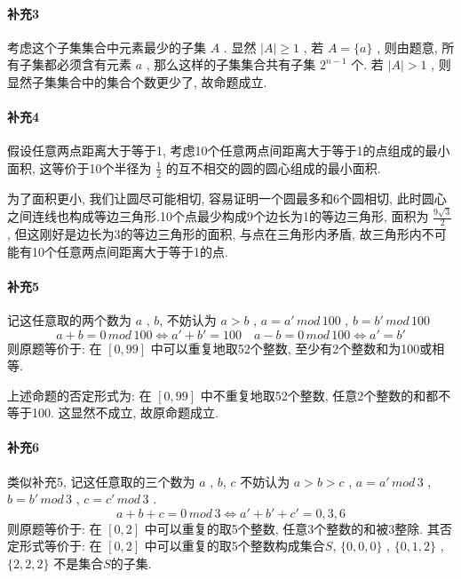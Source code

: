 \documentclass[a4paper, UTF8]{ctexart}				%
\numberwithin{equation}{section}				%
\begin{document}
    \paragraph{补充3} 
        考虑这个子集集合中元素最少的子集 $A$ . 显然 $\vert{A}\vert \ge 1$ , 若 $A = \{a\}$ , 则由题意, 所有子集都必须含有元素 $a$ , 那么这样的子集集合共有子集 $2^{n-1}$ 个. 若 $\vert{A}\vert > 1$ , 则显然子集集合中的集合个数更少了, 故命题成立.
    \paragraph{补充4} 
        假设任意两点距离大于等于1, 考虑10个任意两点间距离大于等于1的点组成的最小面积, 这等价于10个半径为 $\frac{1}{2}$ 的互不相交的圆的圆心组成的最小面积.
        
        为了面积更小, 我们让圆尽可能相切, 容易证明一个圆最多和6个圆相切, 此时圆心之间连线也构成等边三角形.10个点最少构成9个边长为1的等边三角形, 面积为 $\frac{9\sqrt{3}}{2}$ , 但这刚好是边长为3的等边三角形的面积, 与点在三角形内矛盾, 故三角形内不可能有10个任意两点间距离大于等于1的点.
    \paragraph{补充5}
        记这任意取的两个数为 $a$ , $b$, 不妨认为 $a > b$ , $a = a' \, mod \, 100$ , $b = b' \, mod \, 100$
        $$  
            a + b = 0 \, mod \, 100 \Leftrightarrow a' + b' = 100 \quad
            a - b = 0 \, mod \, 100 \Leftrightarrow a' = b'
        $$
        则原题等价于: 在 $[0, 99]$ 中可以重复地取52个整数, 至少有2个整数和为100或相等. 
        
        上述命题的否定形式为: 在 $[0, 99]$ 中不重复地取52个整数, 任意2个整数的和都不等于100. 这显然不成立, 故原命题成立.
    \paragraph{补充6} 
        类似补充5, 记这任意取的三个数为 $a$ , $b$, $c$ 不妨认为 $a > b > c$ , $a = a' \, mod \, 3$ , $b = b' \, mod \, 3$ , $c = c' \, mod \, 3$ .
        $$a + b + c = 0 \, mod \, 3 \Leftrightarrow a' + b' + c' = 0, 3, 6$$
        则原题等价于: 在 $[0,2]$ 中可以重复的取5个整数, 任意3个整数的和被3整除. 其否定形式等价于: 在 $[0,2]$ 中可以重复的取5个整数构成集合$S$, $\{0, 0, 0\}$ , $\{0, 1, 2\}$ , $\{2, 2, 2\}$ 不是集合$S$的子集.
\end{document}

